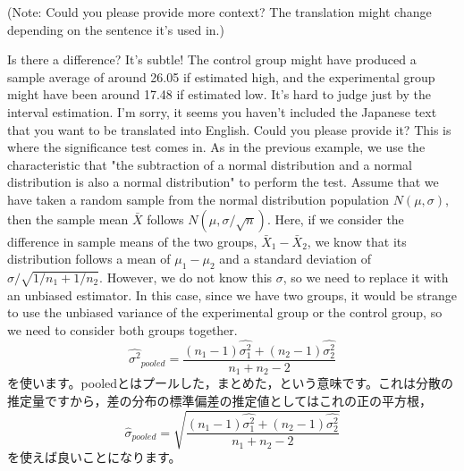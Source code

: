 \documentclass{ltjsbook}
\begin{document}
(Note: Could you please provide more context? The translation might change depending on the sentence it's used in.)

Is there a difference? It's subtle! The control group might have produced a sample average of around 26.05 if estimated high, and the experimental group might have been around 17.48 if estimated low. It's hard to judge just by the interval estimation.
I'm sorry, it seems you haven't included the Japanese text that you want to be translated into English. Could you please provide it?
This is where the significance test comes in. As in the previous example, we use the characteristic that "the subtraction of a normal distribution and a normal distribution is also a normal distribution" to perform the test. Assume that we have taken a random sample from the normal distribution population $N(\mu,\sigma)$, then the sample mean $\bar{X}$ follows $N(\mu,\sigma/\sqrt{n})$. Here, if we consider the difference in sample means of the two groups, $\bar{X}_1 - \bar{X}_2$, we know that its distribution follows a mean of $\mu_1-\mu_2$ and a standard deviation of $\sigma/\sqrt{1/n_1 + 1/n_2}$. However, we do not know this $\sigma$, so we need to replace it with an unbiased estimator. In this case, since we have two groups, it would be strange to use the unbiased variance of the experimental group or the control group, so we need to consider both groups together.
\[ \hat{\sigma^2}_{pooled} = \frac{(n_1-1)\hat{\sigma_1^2}+(n_2-1)\hat{\sigma_2^2}}{n_1+n_2 - 2}\]
を使います。pooledとはプールした，まとめた，という意味です。これは分散の推定量ですから，差の分布の標準偏差の推定値としてはこれの正の平方根，
\[ \hat{\sigma}_{pooled} = \sqrt{\frac{(n_1-1)\hat{\sigma_1^2}+(n_2-1)\hat{\sigma_2^2}}{n_1+n_2 - 2}}\]を使えば良いことになります。
\end{document}
